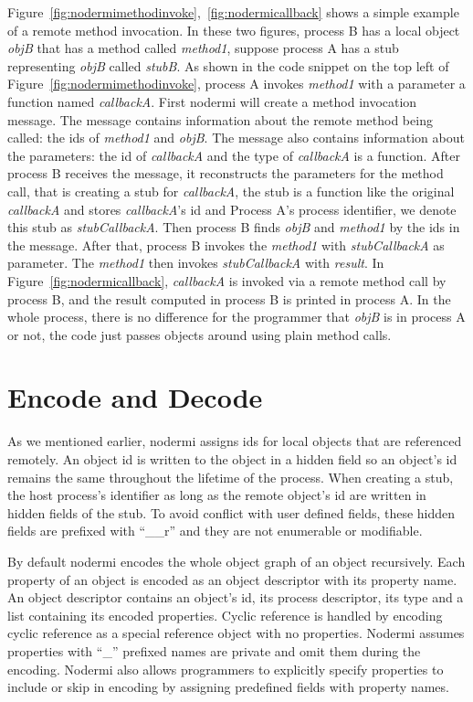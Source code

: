 Figure~\ref{fig:nodermimethodinvoke},~\ref{fig:nodermicallback} shows a simple example
of a remote method invocation.
In these two figures, process B has a local object \emph{objB} that has a method called \emph{method1},
suppose process A has a stub representing \emph{objB} called \emph{stubB}.
As shown in the code snippet on the top left of Figure~\ref{fig:nodermimethodinvoke},
process A invokes \emph{method1} with a parameter a function named \emph{callbackA}.
First nodermi will create a method invocation message.
The message contains information about the remote method being called:
the ids of \emph{method1} and \emph{objB}.
The message also contains information about the parameters:
the id of \emph{callbackA} and the type of \emph{callbackA} is a function.
After process B receives the message,
it reconstructs the parameters for the method call,
that is creating a stub for \emph{callbackA},
the stub is a function like the original \emph{callbackA} and 
stores \emph{callbackA}'s id and Process A's process identifier,
we denote this stub as \emph{stubCallbackA}.
Then process B finds \emph{objB} and \emph{method1} by the ids in the message.
After that,
process B invokes the \emph{method1} with \emph{stubCallbackA} as parameter.
The \emph{method1} then invokes \emph{stubCallbackA} with \emph{result}.
In Figure~\ref{fig:nodermicallback}, \emph{callbackA} is invoked
via a remote method call by process B,
and the result computed in process B is printed in process A.
In the whole process, there is no difference for the programmer that \emph{objB}
is in process A or not, the code just passes objects around using plain method calls.



\section{Encode and Decode}
As we mentioned earlier, nodermi assigns ids for local
objects that are referenced remotely.
An object id is written to the object in a hidden field
so an object's id remains the same throughout the lifetime of the process.
When creating a stub,
the host process's identifier as long as the remote object's id
are written in hidden fields of the stub.
To avoid conflict with user defined fields, these hidden fields are prefixed
with ``\_\_r'' and they are not enumerable or modifiable.

By default nodermi encodes the whole object graph of an object recursively.
Each property of an object is encoded 
as an object descriptor with its property name.
An object descriptor contains an object's id, its process descriptor,
its type and a list containing its encoded properties.
Cyclic reference is handled by encoding cyclic reference as
a special reference object with no properties.
Nodermi assumes properties with ``\_'' prefixed names are private
 and omit them during the encoding.
Nodermi also allows programmers to explicitly specify properties
to include or skip in encoding by assigning predefined fields 
with property names.

